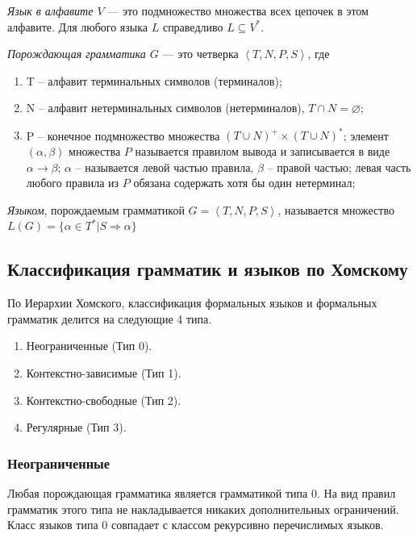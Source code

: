 \textit{Язык в алфавите $V$} — это подмножество множества всех цепочек в этом алфавите. 
Для любого языка $L$ справедливо $L \subseteq V^{*}$.


\textit{Порождающая грамматика $G$} — это четверка $\left\langle {T, N, P, S} \right\rangle$, где
\begin{enumerate}
   \item T -- алфавит терминальных символов (терминалов);
   \item N -- алфавит нетерминальных символов (нетерминалов), $T \cap N = \varnothing$;  
   \item P -- конечное подмножество множества $(T \cup N)^{+} \times (T \cup N)^{*}$; 
   элемент $(\alpha, \beta)$ множества $P$ называется правилом вывода и записывается в виде $\alpha \rightarrow \beta$; 
   $\alpha$ -- называется левой частью правила, 
   $\beta$ -- правой частью; левая часть любого правила из $P$ обязана содержать хотя бы один нетерминал; 
\end{enumerate}

\textit{Языком}, порождаемым грамматикой $G = \left\langle {T, N, P, S} \right\rangle$, 
называется множество $L(G) = \{ \alpha \in T^{*} | S \Rightarrow \alpha \}$ 

\subsection{Классификация грамматик и языков по Хомскому}

По Иерархии Хомского, классификация формальных языков 
и формальных грамматик делится на следующие 4 типа.

\begin{enumerate}
   \item Неограниченные (Тип 0).
   \item Контекстно-зависимые (Тип 1).
   \item Контекстно-свободные (Тип 2).
   \item Регулярные (Тип 3). 
\end{enumerate}

\subsubsection{Неограниченные}

Любая порождающая грамматика является грамматикой типа 0. 
На вид правил грамматик этого типа не накладывается никаких дополнительных ограничений. 
Класс языков типа 0 совпадает с классом рекурсивно перечислимых языков. 

